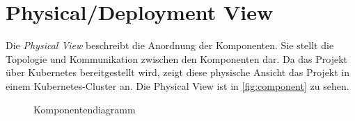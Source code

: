 \section{Physical/Deployment View}

Die \textit{Physical View} beschreibt die Anordnung der Komponenten.
Sie stellt die Topologie und Kommunikation zwischen den Komponenten dar. 
Da das Projekt über Kubernetes bereitgestellt wird, zeigt diese physische Ansicht das Projekt in einem Kubernetes-Cluster an.
Die Physical View ist in \autoref{fig:component} zu sehen.

\begin{figure}[h]
    \centering
    \caption{Komponentendiagramm}
    \label{fig:component}
\end{figure}
